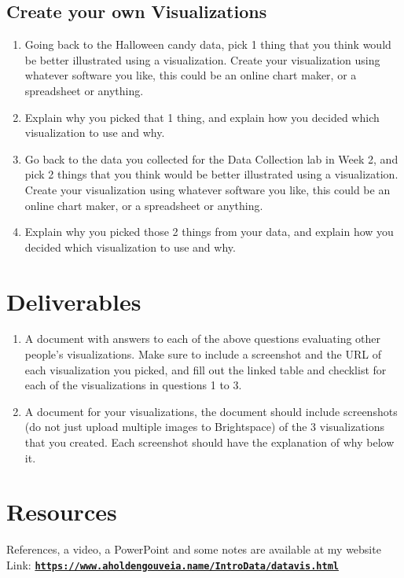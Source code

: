 \documentclass[12pt]{article}
\begin{document}
    \subsection*{Create your own Visualizations}
    \begin{enumerate}
        \item Going back to the Halloween candy data, pick 1 thing that you think would be better illustrated using a visualization.  Create your visualization using whatever software you like, this could be an online chart maker, or a spreadsheet or anything. 
        \item Explain why you picked that 1 thing, and explain how you decided which visualization to use and why.
        \item Go back to the data you collected for the Data Collection lab in Week 2, and pick 2 things that you think would be better illustrated using a visualization. Create your visualization using whatever software you like, this could be an online chart maker, or a spreadsheet or anything. 
        \item Explain why you picked those 2 things from your data, and explain how you decided which visualization to use and why.
    \end{enumerate}

    \section*{Deliverables}
    \begin{sloppypar}
    \begin{enumerate}
        \item A document with answers to each of the above questions evaluating other people's visualizations. Make sure to include a screenshot and the URL of each visualization you picked, and fill out the linked table and checklist for each of the visualizations in questions 1 to 3.
        \item A document for your visualizations, the document should include screenshots (do not just upload multiple images to Brightspace) of the 3 visualizations that you created. Each screenshot should have the explanation of why below it.
    \end{enumerate}
    \end{sloppypar}

\section*{Resources}
References, a video, a PowerPoint and some notes are available at my website
Link: \href{https://www.aholdengouveia.name/IntroData/datavis.html}{\textbf{\nolinkurl{https://www.aholdengouveia.name/IntroData/datavis.html}}}
\end{document}
